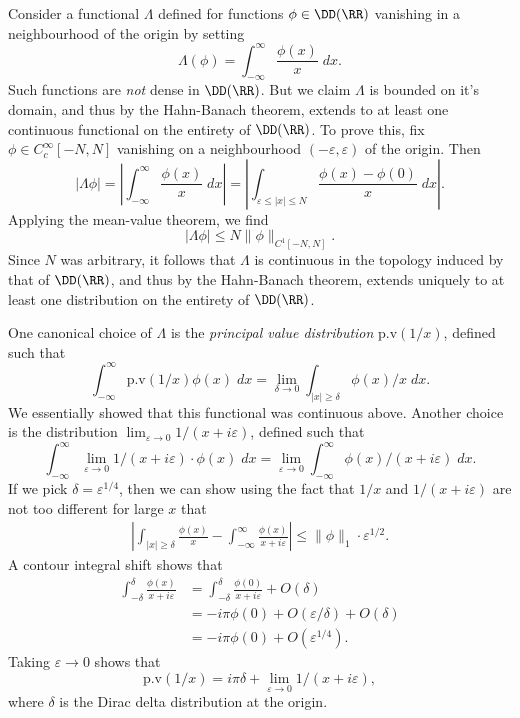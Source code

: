 \begin{example}
    Consider a functional $\Lambda$ defined for functions $\phi \in \DD(\RR)$ vanishing in a neighbourhood of the origin by setting
    \[ \Lambda(\phi) = \int_{-\infty}^\infty \frac{\phi(x)}{x}\; dx. \]
    Such functions are \emph{not} dense in $\DD(\RR)$. But we claim $\Lambda$ is bounded on it's domain, and thus by the Hahn-Banach theorem, extends to at least one continuous functional on the entirety of $\DD(\RR)$. To prove this, fix $\phi \in C_c^\infty[-N,N]$ vanishing on a neighbourhood $(-\varepsilon,\varepsilon)$ of the origin. Then
    \[ |\Lambda \phi| = \left| \int_{-\infty}^\infty \frac{\phi(x)}{x}\; dx \right| = \left| \int_{\varepsilon \leq |x| \leq N} \frac{\phi(x) - \phi(0)}{x}\; dx \right|. \]
    Applying the mean-value theorem, we find
    \[ |\Lambda \phi| \leq N \| \phi \|_{C^1[-N,N]}. \]
    Since $N$ was arbitrary, it follows that $\Lambda$ is continuous in the topology induced by that of $\DD(\RR)$, and thus by the Hahn-Banach theorem, extends uniquely to at least one distribution on the entirety of $\DD(\RR)$.

    One canonical choice of $\Lambda$ is the \emph{principal value distribution} $\text{p.v}(1/x)$, defined such that
    \[ \int_{-\infty}^\infty \text{p.v}(1/x) \phi(x)\; dx = \lim_{\delta \to 0} \int_{|x| \geq \delta} \phi(x) / x\; dx. \]
    We essentially showed that this functional was continuous above. Another choice is the distribution $\lim_{\varepsilon \to 0} 1/(x + i \varepsilon)$, defined such that
    \[ \int_{-\infty}^\infty \lim_{\varepsilon \to 0} 1/(x + i \varepsilon) \cdot \phi(x)\; dx = \lim_{\varepsilon \to 0} \int_{-\infty}^\infty \phi(x) / (x + i \varepsilon)\; dx. \]
    If we pick $\delta = \varepsilon^{1/4}$, then we can show using the fact that $1/x$ and $1/(x + i \varepsilon)$ are not too different for large $x$ that
    \begin{align*}
        \left| \int_{|x| \geq \delta} \frac{\phi(x)}{x} - \int_{-\infty}^\infty \frac{\phi(x)}{x + i\varepsilon} \right| \leq \| \phi \|_1 \cdot \varepsilon^{1/2}.
    \end{align*}
    A contour integral shift shows that
    \begin{align*}
        \int_{-\delta}^\delta \frac{\phi(x)}{x + i\varepsilon} &= \int_{-\delta}^\delta \frac{\phi(0)}{x + i \varepsilon} + O(\delta)\\
        &= -i \pi \phi(0) + O(\varepsilon / \delta) + O(\delta)\\
        &= -i \pi \phi(0) + O(\varepsilon^{1/4}).
    \end{align*}
    Taking $\varepsilon \to 0$ shows that
    \[ \text{p.v}(1/x) = i \pi \delta + \lim_{\varepsilon \to 0} 1/(x + i \varepsilon), \]
    where $\delta$ is the Dirac delta distribution at the origin.


\end{example}
